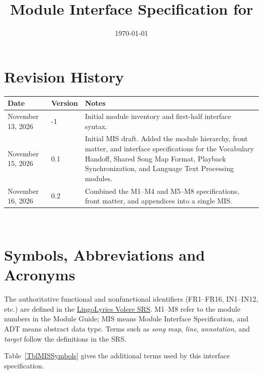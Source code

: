 \documentclass[12pt, titlepage]{article}
\begin{document}
\title{Module Interface Specification for \progname{}}

\author{\authname}

\date{\today}

\maketitle


\section{Revision History}

\begin{tabularx}{\textwidth}{p{3cm}p{2cm}X}
\toprule {\bf Date} & {\bf Version} & {\bf Notes}\\
\midrule
November 13, 2026 & -1 & Initial module inventory and first-half interface syntax.\\
November 15, 2026 & 0.1 & Initial MIS draft. Added the module hierarchy,
front matter, and interface specifications for the Vocabulary Handoff, Shared
Song Map Format, Playback Synchronization, and Language Text Processing
modules.\\
November 16, 2026 & 0.2 & Combined the M1--M4 and M5--M8 specifications,
front matter, and appendices into a single MIS.\\
\bottomrule
\end{tabularx}

~\newpage

\section{Symbols, Abbreviations and Acronyms}

The authoritative functional and nonfunctional identifiers (FR1--FR16,
IN1--IN12, etc.) are defined in the
\href{https://github.com/rhea333/LingoLyrics/blob/main/docs/SRS-Volere/SRS.tex}
{LingoLyrics Volere SRS}. M1--M8 refer to the module numbers in the
Module Guide; MIS means Module Interface Specification, and ADT means
abstract data type. Terms such as \emph{song map}, \emph{line},
\emph{annotation}, and \emph{target} follow the definitions in the SRS.

Table~\ref{TblMISSymbols} gives the additional terms used by this interface
specification.
\end{document}

